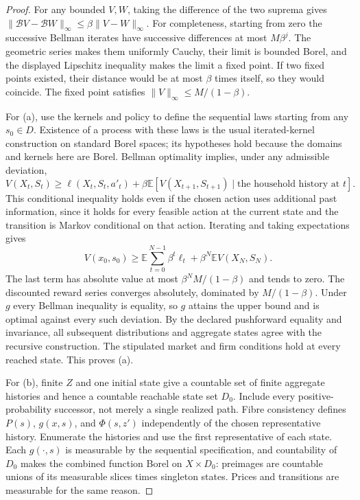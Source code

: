 \documentclass[11pt,a4paper]{article}
\newcommand{\E}{\mathbb E}
\theoremstyle{definition}
\begin{document}
\begin{proof}
For any bounded $V,W$, taking the difference of the two suprema gives
$\|\mathcal BV-\mathcal BW\|_\infty\le\beta\|V-W\|_\infty$.
For completeness, starting from zero the successive Bellman iterates have successive differences at most $M\beta^j$. The geometric series makes them uniformly Cauchy, their limit is bounded Borel, and the displayed Lipschitz inequality makes the limit a fixed point. If two fixed points existed, their distance would be at most $\beta$ times itself, so they would coincide. The fixed point satisfies $\|V\|_\infty\le M/(1-\beta)$.

For (a), use the kernels and policy to define the sequential laws starting from any $s_0\in D$. Existence of a process with these laws is the usual iterated-kernel construction on standard Borel spaces; its hypotheses hold because the domains and kernels here are Borel. Bellman optimality implies, under any admissible deviation,
\[
 V(X_t,S_t)\ge \ell(X_t,S_t,a'_{t})
       +\beta\E[V(X_{t+1},S_{t+1})\mid\text{the household history at }t].
\]
This conditional inequality holds even if the chosen action uses additional past information, since it holds for every feasible action at the current state and the transition is Markov conditional on that action. Iterating and taking expectations gives
\[
 V(x_0,s_0)\ge\E\sum_{t=0}^{N-1}\beta^t\ell_t
                   +\beta^N\E V(X_N,S_N).
\]
The last term has absolute value at most $\beta^NM/(1-\beta)$ and tends to zero. The discounted reward series converges absolutely, dominated by $M/(1-\beta)$. Under $g$ every Bellman inequality is equality, so $g$ attains the upper bound and is optimal against every such deviation. By the declared pushforward equality and invariance, all subsequent distributions and aggregate states agree with the recursive construction. The stipulated market and firm conditions hold at every reached state. This proves (a).

For (b), finite $Z$ and one initial state give a countable set of finite aggregate histories and hence a countable reachable state set $D_0$. Include every positive-probability successor, not merely a single realized path. Fibre consistency defines $P(s)$, $g(x,s)$, and $\Phi(s,z')$ independently of the chosen representative history. Enumerate the histories and use the first representative of each state. Each $g(\cdot,s)$ is measurable by the sequential specification, and countability of $D_0$ makes the combined function Borel on $X\times D_0$: preimages are countable unions of its measurable slices times singleton states. Prices and transitions are measurable for the same reason.


\end{proof}
\end{document}
